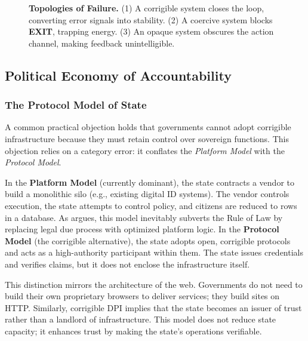 \documentclass{article}
\begin{document}
\begin{figure}[htbp]
\caption{\textbf{Topologies of Failure.}
(1) A corrigible system closes the loop, converting error signals into stability.
(2) A coercive system blocks \textbf{EXIT}, trapping energy.
(3) An opaque system obscures the action channel, making feedback unintelligible.}
\label{fig:failure_modes}
\end{figure}

\subsection{Political Economy of Accountability}
\label{subsec:political-economy}

\subsubsection{The Protocol Model of State}

A common practical objection holds that governments cannot adopt corrigible infrastructure because they must retain control over sovereign functions. This objection relies on a category error: it conflates the \textit{Platform Model} with the \textit{Protocol Model}.

In the \textbf{Platform Model} (currently dominant), the state contracts a vendor to build a monolithic silo (e.g., existing digital ID systems). The vendor controls execution, the state attempts to control policy, and citizens are reduced to rows in a database. As \citet{cohen2019} argues, this model inevitably subverts the Rule of Law by replacing legal due process with optimized platform logic. In the \textbf{Protocol Model} (the corrigible alternative), the state adopts open, corrigible protocols and acts as a high-authority participant within them. The state issues credentials and verifies claims, but it does not enclose the infrastructure itself.

This distinction mirrors the architecture of the web. Governments do not need to build their own proprietary browsers to deliver services; they build sites on HTTP. Similarly, corrigible DPI implies that the state becomes an issuer of trust rather than a landlord of infrastructure. This model does not reduce state capacity; it enhances trust by making the state's operations verifiable.
\end{document}
